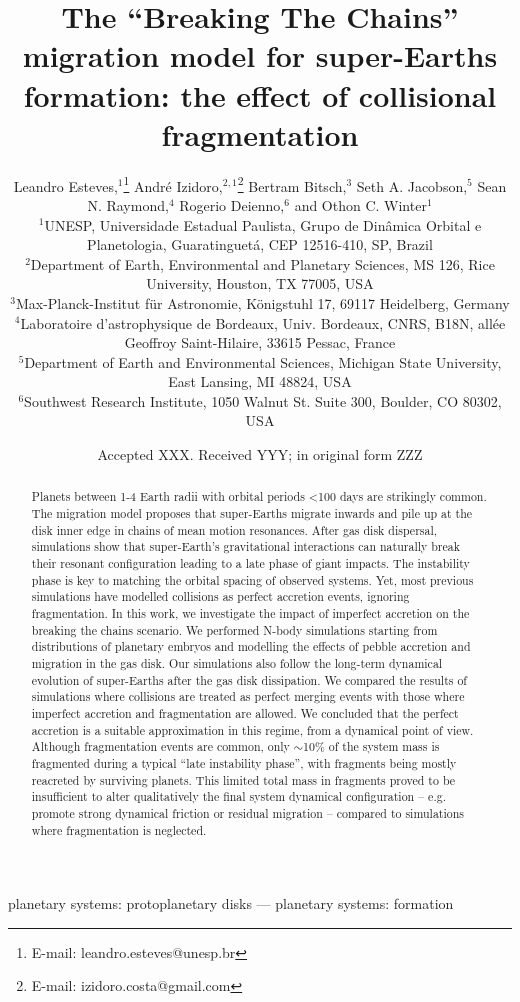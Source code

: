 \documentclass[fleqn,usenatbib]{mnras}
\title[Effect of fragmentation on super-Earth formation]{The ``Breaking The Chains'' migration model for super-Earths formation: the effect of collisional fragmentation}
\author[L. Esteves et al.]{
Leandro Esteves,$^{1}$\thanks{E-mail: leandro.esteves@unesp.br}
André Izidoro,$^{2,1}$\thanks{E-mail: izidoro.costa@gmail.com}
Bertram Bitsch,$^{3}$
Seth A. Jacobson,$^{5}$
\newauthor
Sean N. Raymond,$^{4}$ Rogerio Deienno,$^{6}$
and Othon C. Winter$^{1}$
\\
$^{1}$UNESP, Universidade Estadual Paulista, Grupo de Dinâmica Orbital e Planetologia, Guaratinguetá, CEP 12516-410, SP, Brazil\\
$^{2}$Department of Earth, Environmental and Planetary Sciences, MS 126, Rice
University, Houston, TX 77005, USA\\
$^{3}$Max-Planck-Institut für Astronomie, Königstuhl 17, 69117 Heidelberg, Germany\\
$^{4}$Laboratoire d’astrophysique de Bordeaux, Univ. Bordeaux, CNRS, B18N, allée Geoffroy Saint-Hilaire, 33615 Pessac, France\\
$^{5}$Department of Earth and Environmental Sciences, Michigan State University, East Lansing, MI 48824, USA \\
$^{6}$Southwest Research Institute, 1050 Walnut St. Suite 300, Boulder, CO 80302, USA
}
\date{Accepted XXX. Received YYY; in original form ZZZ}
\begin{document}
\label{firstpage}
\pagerange{\pageref{firstpage}--\pageref{lastpage}}
\maketitle

\begin{abstract}
Planets between 1-4 Earth radii with orbital periods <100 days are strikingly common. The migration model proposes that super-Earths migrate inwards and pile up at the disk inner edge in chains of mean motion resonances. After gas disk dispersal, simulations show that super-Earth’s gravitational interactions can naturally break their resonant configuration leading to a late phase of giant impacts. The instability phase is key to matching the orbital spacing of observed systems. Yet, most previous simulations have modelled collisions as perfect accretion events, ignoring fragmentation. In this work, we investigate the impact of imperfect accretion on the breaking the chains scenario. We performed N-body simulations starting from distributions of planetary embryos and modelling the effects of pebble accretion and migration in the gas disk. Our simulations also follow the long-term dynamical evolution of super-Earths after the gas disk dissipation. We compared the results of simulations where collisions are treated as perfect merging events with those where imperfect accretion and fragmentation are allowed. We concluded that the perfect accretion is a suitable approximation in this regime, from a dynamical point of view. Although fragmentation events are common,  only $\sim$10\% of the system mass is fragmented during a typical “late instability phase”, with fragments being mostly reacreted by surviving planets.  This limited total mass in fragments proved to be insufficient to alter qualitatively the final system dynamical configuration -- e.g. promote strong dynamical friction or residual migration -- compared to simulations where fragmentation is neglected.
\end{abstract}

\begin{keywords}
planetary systems: protoplanetary disks --- planetary systems: formation
\end{keywords}


\end{document}
